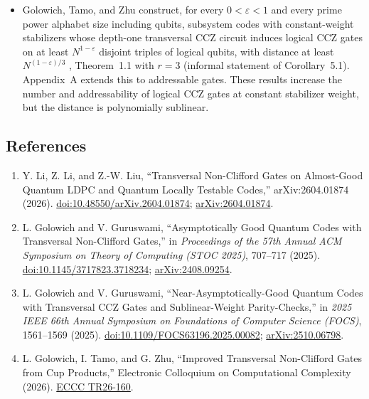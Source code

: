 \begin{itemize}
  \item Golowich, Tamo, and Zhu construct, for every $0<\varepsilon<1$ and every
prime power alphabet size including qubits, subsystem codes with
constant-weight stabilizers whose depth-one transversal CCZ circuit induces
logical CCZ gates on at least $N^{1-\varepsilon}$ disjoint triples of logical
qubits, with distance at least $N^{(1-\varepsilon)/3}$
, Theorem~1.1 with $r=3$ (informal statement
of Corollary~5.1).  Appendix~A extends this to addressable gates.  These
results increase the number and addressability of logical CCZ gates at
constant stabilizer weight, but the distance is polynomially sublinear.
\end{itemize}

\subsection*{References}

\begin{enumerate}[label={},leftmargin=4.8em,labelsep=0.5em]
  \footnotesize
  \item[\textup{[LLL26]}]\label{ref:15c6-lll}
  Y. Li, Z. Li, and Z.-W. Liu, ``Transversal Non-Clifford Gates on
Almost-Good Quantum LDPC and Quantum Locally Testable Codes,''
arXiv:2604.01874 (2026).
\href{https://doi.org/10.48550/arXiv.2604.01874}{doi:10.48550/arXiv.2604.01874};
\href{https://arxiv.org/abs/2604.01874}{arXiv:2604.01874}.

  \item[\textup{[GG25a]}]\label{ref:15c6-gg-stoc}
  L. Golowich and V. Guruswami, ``Asymptotically Good Quantum Codes with
Transversal Non-Clifford Gates,'' in \emph{Proceedings of the 57th Annual ACM
Symposium on Theory of Computing (STOC 2025)}, 707--717 (2025).
\href{https://doi.org/10.1145/3717823.3718234}{doi:10.1145/3717823.3718234};
\href{https://arxiv.org/abs/2408.09254}{arXiv:2408.09254}.

  \item[\textup{[GG25b]}]\label{ref:15c6-gg-focs}
  L. Golowich and V. Guruswami, ``Near-Asymptotically-Good Quantum Codes
with Transversal CCZ Gates and Sublinear-Weight Parity-Checks,'' in
\emph{2025 IEEE 66th Annual Symposium on Foundations of Computer Science
(FOCS)}, 1561--1569 (2025).
\href{https://doi.org/10.1109/FOCS63196.2025.00082}{doi:10.1109/FOCS63196.2025.00082};
\href{https://arxiv.org/abs/2510.06798}{arXiv:2510.06798}.

  \item[\textup{[GTZ26]}]\label{ref:15c6-gtz}
  L. Golowich, I. Tamo, and G. Zhu, ``Improved Transversal Non-Clifford
Gates from Cup Products,'' Electronic Colloquium on Computational Complexity
(2026).
\href{https://eccc.weizmann.ac.il/report/2026/160/}{ECCC TR26-160}.
\end{enumerate}

